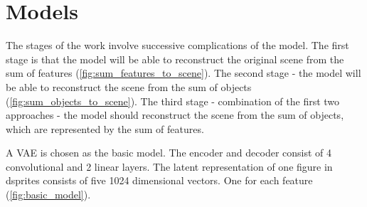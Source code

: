\documentclass{article}
\begin{document}
    \section{Models}

    The stages of the work involve successive complications of the model.
    The first stage is that the model will be able to reconstruct the
    original scene from the sum of features (\autoref{fig:sum_features_to_scene}).
    The second stage - the model will be able to reconstruct the scene
    from the sum of objects (\autoref{fig:sum_objects_to_scene}). The third stage - combination of the first
    two approaches - the model should reconstruct the scene
    from the sum of objects, which are represented by the sum of features.

    A VAE is chosen as the basic model. The encoder and
    decoder consist of 4 convolutional and 2 linear layers. The latent
    representation of one figure in dsprites consists of five 1024
    dimensional vectors. One for each feature (\autoref{fig:basic_model}).
\end{document}
